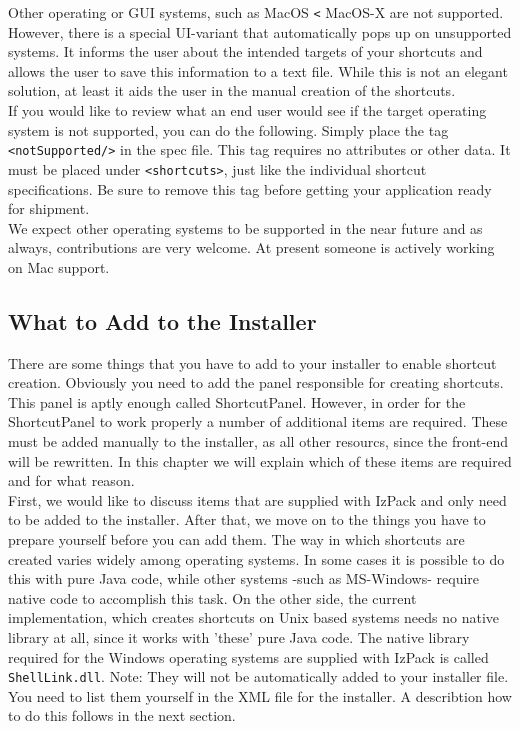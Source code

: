 Other operating or GUI systems, such as MacOS \texttt{<} MacOS-X are
not supported. However, there is a special UI-variant that automatically pops up
on unsupported systems. It informs the user about the intended targets of your shortcuts and allows
the user to save this information to a text file. While this is not an
elegant solution, at least it aids the user in the manual creation of
the shortcuts.\\

If you would like to review what an end user would see if the target
operating system is not supported, you can do the following. Simply
place the tag \texttt{<notSupported/>} in the spec file. This tag requires no
attributes or other data. It must be placed under \texttt{<shortcuts>}, just like
the individual shortcut specifications. Be sure to remove this tag
before getting your application ready for shipment.\\

We expect other operating systems to be supported in the near future and
as always, contributions are very welcome. At present someone is
actively working on Mac support.

\subsection{What to Add to the Installer}

There are some things that you have to add to your installer to enable
shortcut creation. Obviously you need to add the panel
responsible for creating shortcuts. This panel is aptly enough called
ShortcutPanel. However, in order for the ShortcutPanel to work
properly a number of additional items are required. These must be added
manually to the installer, as all other resourcs, since the front-end will be rewritten.
In this chapter we will explain which of these items are
required and for what reason.\\

First, we would like to discuss items that are supplied with IzPack and
only need to be added to the installer. After that, we move on to the
things you have to prepare yourself before you can add them. The way in
which shortcuts are created varies widely among operating systems. In
some cases it is possible to do this with pure Java code, while
other systems -such as MS-Windows- require native code to accomplish
this task. On the other side, the current implementation, which creates shortcuts on
Unix based systems needs no native library at all, since it works with 'these' pure Java code.
The native library required for the Windows operating
systems are supplied with IzPack is called \texttt{ShellLink.dll}.
Note: They will not be automatically added to your installer file.
You need to list them yourself in the XML file for
the installer. A describtion how to do this follows in the next section.\\


